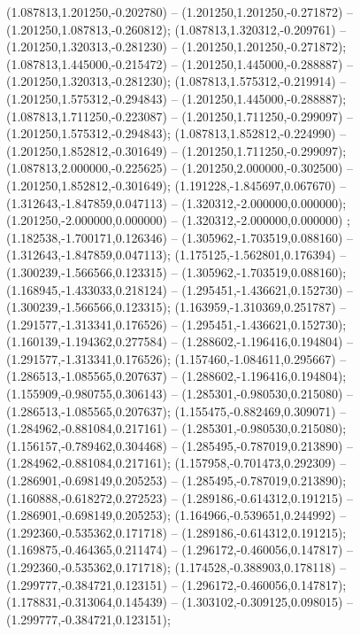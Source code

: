  (1.087813,1.201250,-0.202780) -- (1.201250,1.201250,-0.271872) -- (1.201250,1.087813,-0.260812);
 (1.087813,1.320312,-0.209761) -- (1.201250,1.320313,-0.281230) -- (1.201250,1.201250,-0.271872);
 (1.087813,1.445000,-0.215472) -- (1.201250,1.445000,-0.288887) -- (1.201250,1.320313,-0.281230);
 (1.087813,1.575312,-0.219914) -- (1.201250,1.575312,-0.294843) -- (1.201250,1.445000,-0.288887);
 (1.087813,1.711250,-0.223087) -- (1.201250,1.711250,-0.299097) -- (1.201250,1.575312,-0.294843);
 (1.087813,1.852812,-0.224990) -- (1.201250,1.852812,-0.301649) -- (1.201250,1.711250,-0.299097);
 (1.087813,2.000000,-0.225625) -- (1.201250,2.000000,-0.302500) -- (1.201250,1.852812,-0.301649);
 (1.191228,-1.845697,0.067670) -- (1.312643,-1.847859,0.047113) -- (1.320312,-2.000000,0.000000);
 (1.201250,-2.000000,0.000000) -- (1.320312,-2.000000,0.000000) ;
 (1.182538,-1.700171,0.126346) -- (1.305962,-1.703519,0.088160) -- (1.312643,-1.847859,0.047113);
 (1.175125,-1.562801,0.176394) -- (1.300239,-1.566566,0.123315) -- (1.305962,-1.703519,0.088160);
 (1.168945,-1.433033,0.218124) -- (1.295451,-1.436621,0.152730) -- (1.300239,-1.566566,0.123315);
 (1.163959,-1.310369,0.251787) -- (1.291577,-1.313341,0.176526) -- (1.295451,-1.436621,0.152730);
 (1.160139,-1.194362,0.277584) -- (1.288602,-1.196416,0.194804) -- (1.291577,-1.313341,0.176526);
 (1.157460,-1.084611,0.295667) -- (1.286513,-1.085565,0.207637) -- (1.288602,-1.196416,0.194804);
 (1.155909,-0.980755,0.306143) -- (1.285301,-0.980530,0.215080) -- (1.286513,-1.085565,0.207637);
 (1.155475,-0.882469,0.309071) -- (1.284962,-0.881084,0.217161) -- (1.285301,-0.980530,0.215080);
 (1.156157,-0.789462,0.304468) -- (1.285495,-0.787019,0.213890) -- (1.284962,-0.881084,0.217161);
 (1.157958,-0.701473,0.292309) -- (1.286901,-0.698149,0.205253) -- (1.285495,-0.787019,0.213890);
 (1.160888,-0.618272,0.272523) -- (1.289186,-0.614312,0.191215) -- (1.286901,-0.698149,0.205253);
 (1.164966,-0.539651,0.244992) -- (1.292360,-0.535362,0.171718) -- (1.289186,-0.614312,0.191215);
 (1.169875,-0.464365,0.211474) -- (1.296172,-0.460056,0.147817) -- (1.292360,-0.535362,0.171718);
 (1.174528,-0.388903,0.178118) -- (1.299777,-0.384721,0.123151) -- (1.296172,-0.460056,0.147817);
 (1.178831,-0.313064,0.145439) -- (1.303102,-0.309125,0.098015) -- (1.299777,-0.384721,0.123151);
